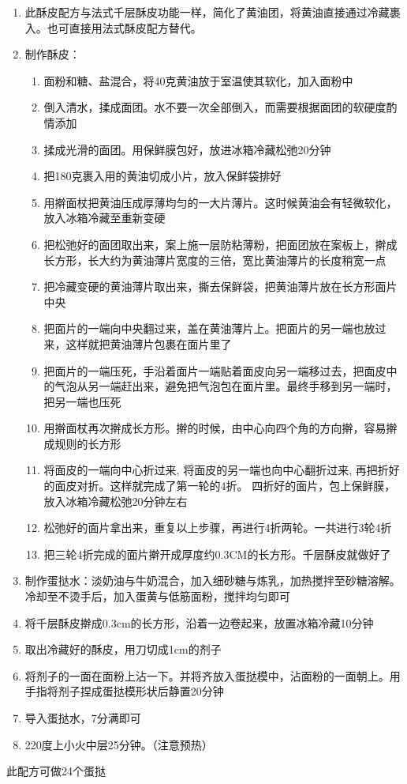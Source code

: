 \begin{enumerate}
    \item 此酥皮配方与法式千层酥皮功能一样，简化了黄油团，将黄油直接通过冷藏裹入。也可直接用法式酥皮配方替代。
    \item 制作酥皮：
    \begin{enumerate}
        \item 面粉和糖、盐混合，将40克黄油放于室温使其软化，加入面粉中
        \item 倒入清水，揉成面团。水不要一次全部倒入，而需要根据面团的软硬度酌情添加
        \item 揉成光滑的面团。用保鲜膜包好，放进冰箱冷藏松弛20分钟
        \item 把180克裹入用的黄油切成小片，放入保鲜袋排好
        \item 用擀面杖把黄油压成厚薄均匀的一大片薄片。这时候黄油会有轻微软化，放入冰箱冷藏至重新变硬
        \item 把松弛好的面团取出来，案上施一层防粘薄粉，把面团放在案板上，擀成长方形，长大约为黄油薄片宽度的三倍，宽比黄油薄片的长度稍宽一点
        \item 把冷藏变硬的黄油薄片取出来，撕去保鲜袋，把黄油薄片放在长方形面片中央
        \item 把面片的一端向中央翻过来，盖在黄油薄片上。把面片的另一端也放过来，这样就把黄油薄片包裹在面片里了
        \item 把面片的一端压死，手沿着面片一端贴着面皮向另一端移过去，把面皮中的气泡从另一端赶出来，避免把气泡包在面片里。最终手移到另一端时，把另一端也压死
        \item 用擀面杖再次擀成长方形。擀的时候，由中心向四个角的方向擀，容易擀成规则的长方形
        \item 将面皮的一端向中心折过来, 将面皮的另一端也向中心翻折过来, 再把折好的面皮对折。这样就完成了第一轮的4折。 四折好的面片，包上保鲜膜，放入冰箱冷藏松弛20分钟左右
        \item 松弛好的面片拿出来，重复以上步骤，再进行4折两轮。一共进行3轮4折
        \item 把三轮4折完成的面片擀开成厚度约0.3CM的长方形。千层酥皮就做好了
    \end{enumerate}
    \item 制作蛋挞水：淡奶油与牛奶混合，加入细砂糖与炼乳，加热搅拌至砂糖溶解。冷却至不烫手后，加入蛋黄与低筋面粉，搅拌均匀即可
    \item 将千层酥皮擀成0.3cm的长方形，沿着一边卷起来，放置冰箱冷藏10分钟
    \item 取出冷藏好的酥皮，用刀切成1cm的剂子
    \item 将剂子的一面在面粉上沾一下。并将齐放入蛋挞模中，沾面粉的一面朝上。用手指将剂子捏成蛋挞模形状后静置20分钟
    \item 导入蛋挞水，7分满即可
    \item 220度上小火中层25分钟。（注意预热）
\end{enumerate}
此配方可做24个蛋挞




